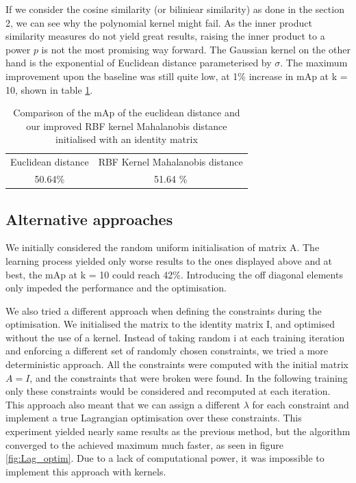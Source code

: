 \documentclass[10pt,technote]{IEEEtran}
\begin{document}
If we consider the cosine similarity (or biliniear similarity) as done in the section 2, we can see why the polynomial kernel might fail. As the inner product similarity measures do not yield great results, raising the inner product to a power $p$ is not the most promising way forward. The Gaussian kernel on the other hand is the exponential of Euclidean distance parameterised by $\sigma$. The maximum improvement upon the baseline was still quite low, at 1\% increase in mAp at k = 10, shown in table \ref{tab:my_label}.

\begin{table}
    \centering
    \begin{tabular}{c|c}
        Euclidean distance & RBF Kernel Mahalanobis distance \\
        50.64\% & 51.64 \%
    \end{tabular}
    \caption{Comparison of the mAp of the euclidean distance and our improved RBF kernel Mahalanobis distance initialised with an identity matrix}
    \label{tab:my_label}
\end{table}



\subsection{Alternative approaches}
We initially considered the random uniform initialisation of matrix A. The learning process yielded only worse results to the ones displayed above and at best, the mAp at k = 10 could reach 42\%. Introducing the off diagonal elements only impeded the performance and the optimisation.

We also tried a different approach when defining the constraints during the optimisation. We initialised the matrix to the identity matrix I, and optimised without the use of a kernel. Instead of taking random i at each training iteration and enforcing a different set of randomly chosen constraints, we tried a more deterministic approach. All the constraints were computed with the initial matrix $A=I$, and the constraints that were broken were found. In the following training only these constraints would be considered and recomputed at each iteration. This approach also meant that we can assign a different $\lambda$ for each constraint and implement a true Lagrangian optimisation over these constraints. This experiment yielded nearly same results as the previous method, but the algorithm converged to the achieved maximum much faster, as seen in figure \ref{fig:Lag_optim}. Due to a lack of computational power, it was impossible to implement this approach with kernels.
\end{document}
